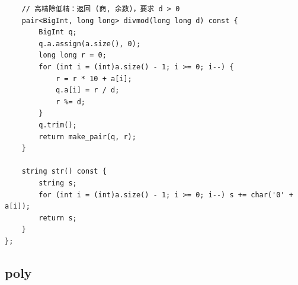 \documentclass[11pt,a4paper]{ctexart}
\begin{document}
\begin{lstlisting}
    // 高精除低精：返回 (商, 余数)，要求 d > 0
    pair<BigInt, long long> divmod(long long d) const {
        BigInt q;
        q.a.assign(a.size(), 0);
        long long r = 0;
        for (int i = (int)a.size() - 1; i >= 0; i--) {
            r = r * 10 + a[i];
            q.a[i] = r / d;
            r %= d;
        }
        q.trim();
        return make_pair(q, r);
    }

    string str() const {
        string s;
        for (int i = (int)a.size() - 1; i >= 0; i--) s += char('0' + a[i]);
        return s;
    }
};
\end{lstlisting}

\subsection{poly}
\end{document}

